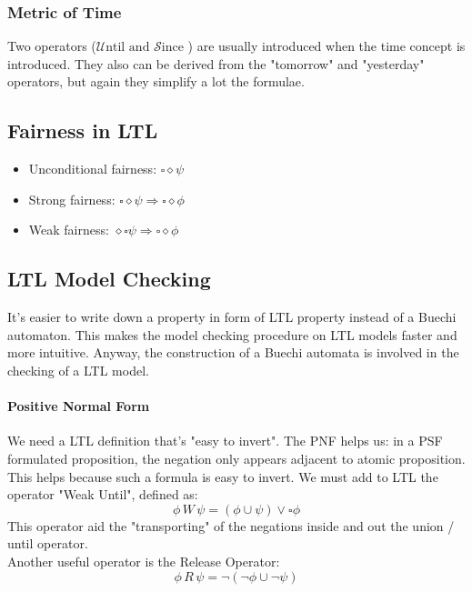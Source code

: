 \documentclass{article}
\begin{document}
				\subsubsection{Metric of Time}
					Two operators ($\mathcal{U} \text{ntil and } \mathcal{S} \text{ince }$) are usually introduced when the time concept is introduced. They also can be derived from the "tomorrow" and "yesterday" operators, but again they simplify a lot the formulae.
		
			\subsection{Fairness in LTL}
				\begin{itemize}
					\item Unconditional fairness: $\square \diamond \psi$
					\item Strong fairness: $\square \diamond \psi \Rightarrow \square \diamond \phi$
					\item Weak fairness: $\diamond \square \psi \Rightarrow \square \diamond \phi$
				\end{itemize}
				
			\subsection{LTL Model Checking}
				It's easier to write down a property in form of LTL property instead of a Buechi automaton. This makes the model checking procedure on LTL models faster and more intuitive. Anyway, the construction of a Buechi automata is involved in the checking of a LTL model.
				
				\paragraph{Positive Normal Form}
					We need a LTL definition that's "easy to invert". The PNF helps us: in a PSF formulated proposition, the negation only appears adjacent to atomic proposition. This helps because such a formula is easy to invert. We must add to LTL the operator "Weak Until", defined as:
					\begin{equation}
						\phi \,W\, \psi = (\phi \cup \psi) \vee \square \phi
					\end{equation}
					This operator aid the "transporting" of the negations inside and out the union / until operator.\\
					Another useful operator is the Release Operator:
					\begin{equation}
						\phi \,R\, \psi = \lnot(\lnot \phi \cup \lnot \psi)
					\end{equation}
					
\end{document}
